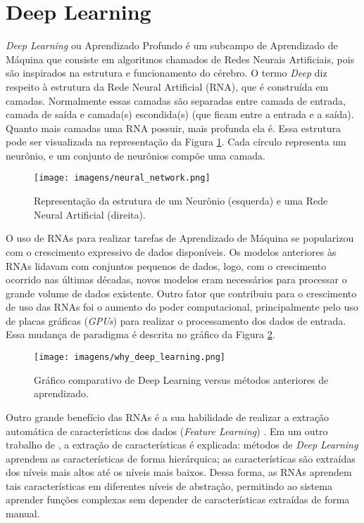 \documentclass[
12pt,       %
openright,      %
oneside,      %
a4paper,      %
english,      %
french,       %
spanish,      %
brazil        %
]{abntex2}
\begin{document}
\section{Deep Learning} \label{deeplearning}

\textit{Deep Learning} ou Aprendizado Profundo é um subcampo de Aprendizado de Máquina que consiste em algoritmos chamados de Redes Neurais Artificiais, pois são inspirados na estrutura e funcionamento do cérebro. O termo \textit{Deep} diz respeito à estrutura da Rede Neural Artificial (RNA), que é construída em camadas. Normalmente essas camadas são separadas entre camada de entrada, camada de saída e camada(s) escondida(s) (que ficam entre a entrada e a saída). Quanto mais camadas uma RNA possuir, mais profunda ela é. Essa estrutura pode ser visualizada na representação da Figura \ref{fig:neural_network}. Cada círculo representa um neurônio, e um conjunto de neurônios compõe uma camada.

\begin{figure}[ht]
\centering
\caption{Representação da estrutura de um Neurônio (esquerda) e uma Rede Neural Artificial (direita).}
\texttt{[image: imagens/neural\_network.png]}
\label{fig:neural_network}
\end{figure}

O uso de RNAs para realizar tarefas de Aprendizado de Máquina se popularizou com o crescimento expressivo de dados disponíveis. Os modelos anteriores às RNAs lidavam com conjuntos pequenos de dados, logo, com o crescimento ocorrido nas últimas décadas, novos modelos eram necessários para processar o grande volume de dados existente. Outro fator que contribuiu para o crescimento de uso das RNAs foi o aumento do poder computacional, principalmente pelo uso de placas gráficas (\textit{GPUs}) para realizar o processamento dos dados de entrada. Essa mudança de paradigma é descrita no gráfico da Figura \ref{fig:why_deep_learning}.

\begin{figure}[ht]
\centering
\caption{Gráfico comparativo de Deep Learning versus métodos anteriores de aprendizado.}
\texttt{[image: imagens/why\_deep\_learning.png]}
\label{fig:why_deep_learning}
\end{figure}

Outro grande benefício das RNAs é a sua habilidade de realizar a extração automática de características dos dados (\textit{Feature Learning}) \cite{bengio2012deep}. Em um outro trabalho de , a extração de características é explicada: métodos de \textit{Deep Learning} aprendem as características de forma hierárquica; as características são extraídas dos níveis mais altos até os níveis mais baixos. Dessa forma, as RNAs aprendem tais características em diferentes níveis de abstração, permitindo ao sistema aprender funções complexas sem depender de características extraídas de forma manual. 
\end{document}
